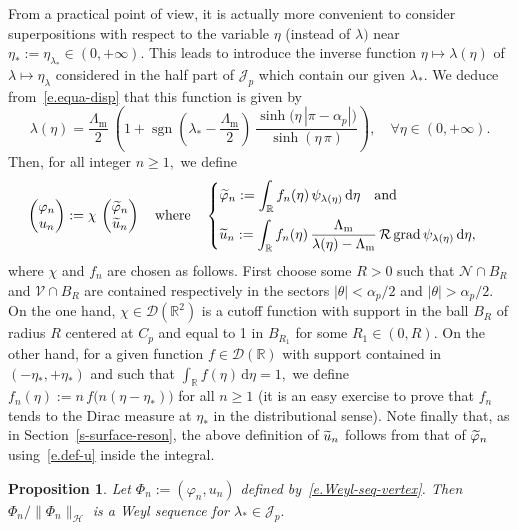 \documentclass[10pt]{amsart}
\newtheorem{prop}[cdrthm]{Proposition}
\theoremstyle{definition}
\DeclareMathOperator{\sgn}{sgn}
\DeclareMathOperator{\grad}{grad}
\newcommand{\calD}{\mathcal{D}}
\newcommand{\calH}{\mathcal{H}}
\newcommand{\calJ}{\mathcal{J}}
\newcommand{\calN}{\mathcal{N}}
\newcommand{\calR}{\mathcal{R}}
\newcommand{\calV}{\mathcal{V}}
\newcommand{\bbR}{\mathbb{R}}
\newcommand{\rmd}{{\mathrm{d}}}
\newcommand{\Lm}{{\Lambda_{\mathrm{m}}}}
\let\oldtilde\tilde
\renewcommand*{\tilde}[1]{\mathchoice{\widetilde{#1}}{\widetilde{#1}}{\oldtilde{#1}}{\oldtilde{#1}}}
\let\oldforall\forall
\renewcommand*{\forall}{\mathrel{\oldforall}}
\begin{document}
From a practical point of view, it is actually more convenient to consider superpositions with respect to the variable $\eta$ (instead of $\lambda)$ near $\eta_* := \eta_{\lambda_*} \in (0,+\infty).$ This leads to introduce the inverse function $\eta \mapsto \lambda(\eta)$ of $\lambda \mapsto \eta_\lambda$ considered in the half part of $\calJ_p$ which contain our given $\lambda_*.$ We deduce from~\eqref{e.equa-disp} that this function is given by
\[
\lambda(\eta) = \frac{\Lm}{2}\ \left(1 + \sgn\left(\lambda_* - \frac{\Lm}{2}\right) \
\frac{\sinh\big(\eta\,|\pi-\alpha_p|\big)}{\sinh(\eta\,\pi)}
\right),
\quad\forall \eta \in (0,+\infty).
\]
Then, for all integer $n \geq 1,$ we define
\begin{equation}\label{e.Weyl-seq-vertex}
\begin{pmatrix} \varphi_n \\ u_n
\end{pmatrix}
:= \chi\,
\begin{pmatrix} \tilde \varphi_n \\ \tilde u_n
\end{pmatrix}
\quad\text{where}\quad
\begin{cases}
\displaystyle \tilde\varphi_n := \int_\bbR f_n(\eta)\, \psi_{\lambda(\eta)} \,\rmd\eta \quad\text{and} \\[10pt]
\displaystyle \tilde u_n := \int_\bbR f_n(\eta)\, \frac{\Lm}{\lambda(\eta)-\Lm}\,\calR \grad\psi_{\lambda(\eta)} \,\rmd\eta,
\end{cases}
\end{equation}
where $\chi$ and $f_n$ are chosen as follows. First choose some $R>0$ such that $\calN \cap B_R$ and $\calV \cap B_R$ are contained respectively in the sectors $|\theta| < \alpha_p/2$ and $|\theta| > \alpha_p/2$. On the one hand, $\chi \in \calD(\bbR^2)$ is a cutoff function with support in the ball $B_R$ of radius $R$ centered at $C_p$ and equal to 1 in $B_{R_1}$ for some $R_1 \in (0,R).$ On the other hand, for a given function $f \in \calD(\bbR)$ with support contained in $(-\eta_*,+\eta_*)$ and such that $\int_\bbR f(\eta) \,\rmd\eta = 1,$ we define $f_n(\eta) := n\,f\big(n(\eta-\eta_*)\big)$ for all $n \geq 1$ (it is an easy exercise to prove that $f_n$ tends to the Dirac measure at $\eta_*$ in the distributional sense). Note finally that, as in Section~\ref{s-surface-reson}, the above definition of $\tilde u_n$ follows from that of $\tilde\varphi_n$ using~\eqref{e.def-u} inside the integral.

\begin{prop}\label{p-Weyl-inner-corner}
Let $\Phi_n := (\varphi_n,u_n)$ defined by~\eqref{e.Weyl-seq-vertex}. Then $\Phi_n/\|\Phi_n\|_\calH$ is a Weyl sequence for $\lambda_* \in \calJ_p.$
\end{prop}
\end{document}
